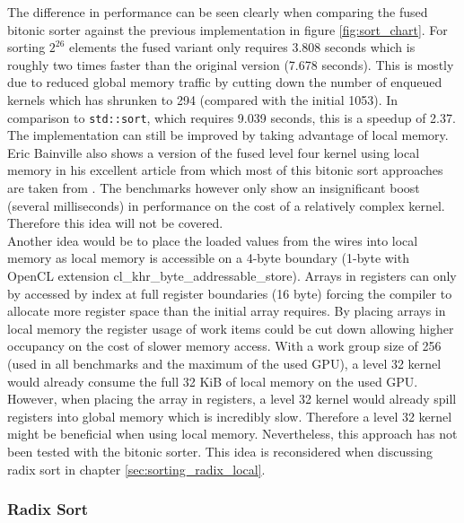 The difference in performance can be seen clearly when comparing the fused bitonic sorter against the previous implementation in figure \ref{fig:sort_chart}. For sorting $2^{26}$ elements the fused variant only requires 3.808 seconds which is roughly two times faster than the original version (7.678 seconds). This is mostly due to reduced global memory traffic by cutting down the number of enqueued kernels which has shrunken to 294 (compared with the initial 1053). In comparison to \lstinline!std::sort!, which requires 9.039 seconds, this is a speedup of 2.37. \\
The implementation can still be improved by taking advantage of local memory. Eric Bainville also shows a version of the fused level four kernel using local memory in his excellent article from which most of this bitonic sort approaches are taken from \cite{sort_bealto}. The benchmarks however only show an insignificant boost (several milliseconds) in performance on the cost of a relatively complex kernel. Therefore this idea will not be covered. \\
Another idea would be to place the loaded values from the wires into local memory as local memory is accessible on a 4-byte boundary (1-byte with OpenCL extension cl\_khr\_byte\_addressable\_store). Arrays in registers can only by accessed by index at full register boundaries (16 byte) forcing the compiler to allocate more register space than the initial array requires. By placing arrays in local memory the register usage of work items could be cut down allowing higher occupancy on the cost of slower memory access. With a work group size of 256 (used in all benchmarks and the maximum of the used GPU), a level 32 kernel would already consume the full 32 KiB of local memory on the used GPU. However, when placing the array in registers, a level 32 kernel would already spill registers into global memory which is incredibly slow. Therefore a level 32 kernel might be beneficial when using local memory. Nevertheless, this approach has not been tested with the bitonic sorter. This idea is reconsidered when discussing radix sort in chapter \ref{sec:sorting_radix_local}.


\subsubsection{Radix Sort}
\label{sec:sorting_radix}

